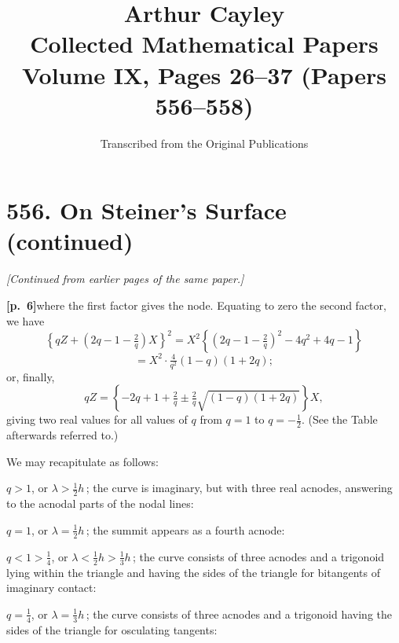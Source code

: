 \documentclass[11pt,a4paper]{article}
\title{\textbf{Arthur Cayley}\\\vspace{0.5em}
\Large Collected Mathematical Papers\\\vspace{0.3em}
\large Volume IX, Pages 26--37 (Papers 556--558)}
\author{Transcribed from the Original Publications}
\date{}
\begin{document}
\maketitle
\thispagestyle{empty}

\tableofcontents
\newpage

\section*{\textbf{556.} On Steiner's Surface (continued)}

\textit{[Continued from earlier pages of the same paper.]}

\bigskip

\noindent\textbf{[p.~6]}\quad where the first factor gives the node. Equating to zero the second factor, we have
\[
\left\{ qZ + \left(2q - 1 - \tfrac{2}{q}\right) X \right\}^{2}
= X^{2} \left\{ \left(2q - 1 - \tfrac{2}{q}\right)^{2} - 4q^{2} + 4q - 1 \right\}
\]
\[
= X^{2} \cdot \tfrac{4}{q^{2}} (1-q)(1+2q);
\]
or, finally,
\[
qZ = \left\{ -2q + 1 + \tfrac{2}{q} \pm \tfrac{2}{q}\sqrt{(1-q)(1+2q)} \right\} X,
\]
giving two real values for all values of $q$ from $q=1$ to $q=-\tfrac{1}{2}$. (See the Table afterwards referred to.)

\medskip

We may recapitulate as follows:

\smallskip

$q > 1$, or $\lambda > \tfrac{1}{2}h$\,; the curve is imaginary, but with three real acnodes, answering to the acnodal parts of the nodal lines:

\smallskip

$q = 1$, or $\lambda = \tfrac{1}{2}h$\,; the summit appears as a fourth acnode:

\smallskip

$q < 1 > \tfrac{1}{4}$, or $\lambda < \tfrac{1}{2}h > \tfrac{1}{3}h$\,; the curve consists of three acnodes and a trigonoid lying within the triangle and having the sides of the triangle for bitangents of imaginary contact:

\smallskip

$q = \tfrac{1}{4}$, or $\lambda = \tfrac{1}{3}h$\,; the curve consists of three acnodes and a trigonoid having the sides of the triangle for osculating tangents:
\end{document}
